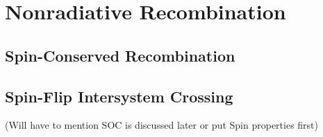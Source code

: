 \section{Nonradiative Recombination}

\subsection{Spin-Conserved Recombination}

\subsection{Spin-Flip Intersystem Crossing}
(Will have to mention SOC is discussed later or put Spin properties first)
